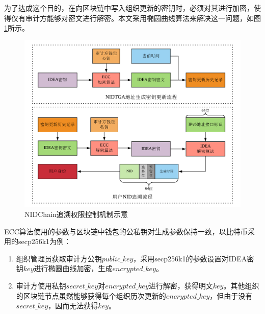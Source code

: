     为了达成这个目的，在向区块链中写入组织更新的密钥时，必须对其进行加密，使得仅有审计方能够对密文进行解密。本文采用椭圆曲线算法\cite{koblitz1987elliptic,miller1985use}来解决这一问题，如图\ref{fig:NIDChain_key_update}所示。
    
    \begin{figure}[ht]
      \centering
      \includegraphics[width=\textwidth]{figures/NIDChain_key_update.png}
      \caption{NIDChain追溯权限控制机制示意}
      \label{fig:NIDChain_key_update}
    \end{figure}
    
    ECC算法使用的参数与区块链中钱包的公私钥对生成参数保持一致，以比特币采用的secp256k1\cite{qu1999sec}为例：
    \begin{enumerate}[1{)}]
      \item 组织管理员获取审计方公钥$public\_key$，采用secp256k1的参数设置对IDEA密钥$key$进行椭圆曲线加密，生成$encrypted\_key$。
      \item 审计方使用私钥$secret\_key$对$encrypted\_key$进行解密，获得明文$key$。其他组织的区块链节点虽然能够获得每个组织历次更新的$encrypted\_key$，但由于没有$secret\_key$，因而无法获得$key$。
    \end{enumerate}

